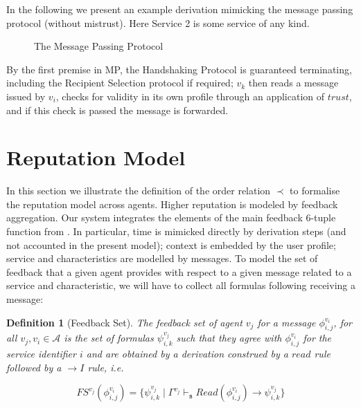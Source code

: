 \documentclass[compsoc, conference, letterpaper, 10pt, times]{IEEEtran}
\newtheorem{definition}{Definition}
\begin{document}
In the following we present an example derivation mimicking the message passing protocol (without mistrust). Here Service 2 is some service of any kind.


\begin{figure*}
	\begin{prooftree}
		\end{prooftree}

	\caption{The Message Passing Protocol}\label{fig:mp}
\end{figure*}


By the first premise in MP, the Handshaking Protocol is guaranteed terminating, including the Recipient Selection protocol if required; $v_{k}$ then reads a message issued by $v_{i}$, checks for validity in its own profile through an application of $trust$, and if this check is passed the message is forwarded.


\section{Reputation Model}

In this section we illustrate the definition of the order relation $\prec$ to formalise the reputation model across agents. Higher reputation is modeled by feedback aggregation. Our system integrates the elements of the main feedback 6-tuple function from \cite{xxx}. In particular, time is mimicked directly by derivation steps (and not accounted in the present model); context is embedded by the user profile; service and characteristics are modelled by messages. To model the set of feedback that a given agent provides with respect to a given message related to a service and characteristic, we will have to collect all formulas following receiving a message:

\begin{definition}[Feedback Set]
The feedback set of agent $v_{j}$ for a message $\phi^{v_{i}}_{i,j}$, for all $v_{j}, v_{i} \in \mathcal{A}$ is the set of formulas $\psi^{v_{j}}_{i,k}$ such that they agree with $\phi^{v_{i}}_{i,j}$ for the service identifier $i$ and are obtained by a derivation construed by a $read$ rule followed by a $\rightarrow I$ rule, i.e.

\[
FS^{v_{j}}(\phi^{v_{i}}_{i,j})=\{ \psi^{v_{j}}_{i,k}\mid \Gamma^{v_{j}}
\vdash_{\mathtt{s}}  Read(\phi^{v_{i}}_{i,j})\rightarrow \psi^{v_{j}}_{i,k}  \}
\]

\end{definition}
\end{document}
